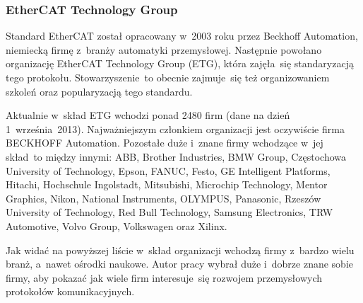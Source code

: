 \subsubsection{EtherCAT Technology Group}

Standard EtherCAT został opracowany w~2003 roku przez Beckhoff Automation, niemiecką firmę z~branży automatyki przemysłowej. Następnie powołano organizację EtherCAT Technology Group (ETG), która zajęła~się standaryzacją tego protokołu. Stowarzyszenie~to obecnie zajmuje~się też organizowaniem szkoleń oraz popularyzacją tego standardu. 

Aktualnie w~skład ETG wchodzi ponad 2480 firm (dane na dzień 1~września~2013). Najważniejszym członkiem organizacji jest oczywiście firma BECKHOFF Automation. Pozostałe duże i~znane firmy wchodzące w~jej skład~to między innymi: ABB, Brother Industries, BMW Group, Częstochowa University of Technology, Epson, FANUC, Festo, GE Intelligent Platforms, Hitachi, Hochschule Ingolstadt, Mitsubishi, Microchip Technology, Mentor Graphics, Nikon, National Instruments, OLYMPUS, Panasonic, Rzeszów University of Technology, Red Bull Technology, Samsung Electronics, TRW Automotive, Volvo Group, Volkswagen oraz Xilinx.

Jak widać na powyższej liście w~skład organizacji wchodzą firmy z~bardzo wielu branż, a~nawet ośrodki naukowe. Autor pracy wybrał duże i~dobrze znane sobie firmy, aby pokazać jak wiele firm interesuje~się rozwojem przemysłowych protokołów komunikacyjnych.


